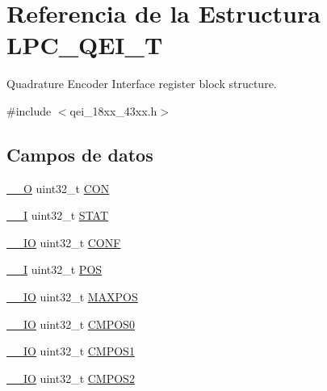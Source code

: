 \hypertarget{struct_l_p_c___q_e_i___t}{}\section{Referencia de la Estructura L\+P\+C\+\_\+\+Q\+E\+I\+\_\+T}
\label{struct_l_p_c___q_e_i___t}


Quadrature Encoder Interface register block structure.  




{\ttfamily \#include $<$qei\+\_\+18xx\+\_\+43xx.\+h$>$}

\subsection*{Campos de datos}
\begin{DoxyCompactItemize}
\item 
\hyperlink{core__sc300_8h_a7e25d9380f9ef903923964322e71f2f6}{\+\_\+\+\_\+O} uint32\+\_\+t \hyperlink{struct_l_p_c___q_e_i___t_a67db6fd16b8f287d95ba87dd07b71f0a}{C\+ON}
\item 
\hyperlink{core__sc300_8h_af63697ed9952cc71e1225efe205f6cd3}{\+\_\+\+\_\+I} uint32\+\_\+t \hyperlink{struct_l_p_c___q_e_i___t_a9d37b00631f37ab3e4a127a7fee46da7}{S\+T\+AT}
\item 
\hyperlink{core__sc300_8h_aec43007d9998a0a0e01faede4133d6be}{\+\_\+\+\_\+\+IO} uint32\+\_\+t \hyperlink{struct_l_p_c___q_e_i___t_a42f5a13cd52a3f76b0b20e3e7cb441b4}{C\+O\+NF}
\item 
\hyperlink{core__sc300_8h_af63697ed9952cc71e1225efe205f6cd3}{\+\_\+\+\_\+I} uint32\+\_\+t \hyperlink{struct_l_p_c___q_e_i___t_ad349c0799c073bca3bdc59ca2f1f2ffd}{P\+OS}
\item 
\hyperlink{core__sc300_8h_aec43007d9998a0a0e01faede4133d6be}{\+\_\+\+\_\+\+IO} uint32\+\_\+t \hyperlink{struct_l_p_c___q_e_i___t_aeca182188d6e2da43879cfe82e4fd438}{M\+A\+X\+P\+OS}
\item 
\hyperlink{core__sc300_8h_aec43007d9998a0a0e01faede4133d6be}{\+\_\+\+\_\+\+IO} uint32\+\_\+t \hyperlink{struct_l_p_c___q_e_i___t_a7217ba8693f2641760f2d4404c854e04}{C\+M\+P\+O\+S0}
\item 
\hyperlink{core__sc300_8h_aec43007d9998a0a0e01faede4133d6be}{\+\_\+\+\_\+\+IO} uint32\+\_\+t \hyperlink{struct_l_p_c___q_e_i___t_ad6681721dc510a40cadb8649e377a0ae}{C\+M\+P\+O\+S1}
\item 
\hyperlink{core__sc300_8h_aec43007d9998a0a0e01faede4133d6be}{\+\_\+\+\_\+\+IO} uint32\+\_\+t \hyperlink{struct_l_p_c___q_e_i___t_a41e0350ea2e9b26c95c50e1d239bd5b8}{C\+M\+P\+O\+S2}

\end{DoxyCompactItemize}
